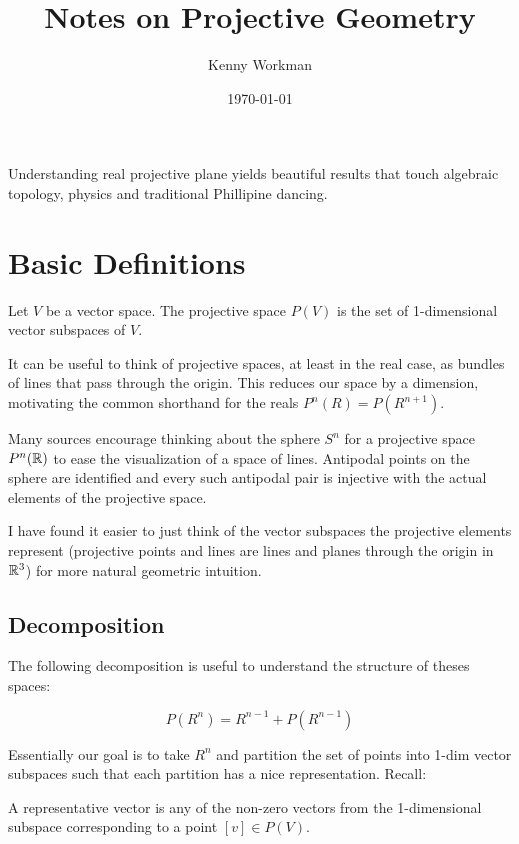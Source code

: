 \documentclass[10pt]{article}
\title{Notes on Projective Geometry}
\author{Kenny Workman}
\date{\today}
\begin{document}
\maketitle

Understanding real projective plane yields beautiful results that touch
algebraic topology, physics and traditional Phillipine dancing.

\section{Basic Definitions}

\begin{definition}
	Let $V$ be a vector space. The projective space $P(V)$ is the set of 1-dimensional vector subspaces of $V$.
\end{definition}

It can be useful to think of projective spaces, at least in the real case, as
bundles of lines that pass through the origin. This reduces our space by a
dimension, motivating the common shorthand for the reals $P^n(R) = P(R^{n+1})$. 

Many sources encourage thinking about the sphere $S^n$ for a projective space
$P^n(\mathbb{R})$ to ease the visualization of a space of lines. Antipodal points on
the sphere are identified and every such antipodal pair is injective with the
actual elements of the projective space. 

I have found it easier to just think of the vector subspaces the projective
elements represent (projective points and lines are lines and planes through the
origin in $\mathbb{R}^3$) for more natural geometric intuition.

\subsection{Decomposition}

The following decomposition is useful to understand the structure of theses spaces:

\[P(R^n) = R^{n-1} + P(R^{n-1}) \]

Essentially our goal is to take $R^n$ and partition the set of points into
1-dim vector subspaces such that each partition has a nice representation.
Recall:

\begin{definition}
	A representative vector is any of the non-zero vectors from the 1-dimensional subspace corresponding to a point $[v] \in P(V)$.
\end{definition}
\end{document}
